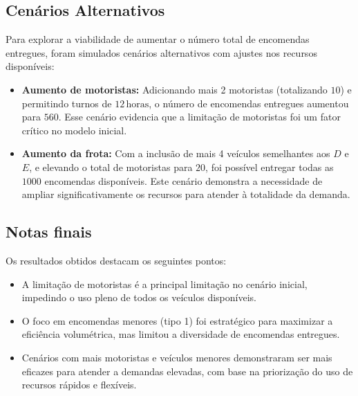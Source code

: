\subsection{Cenários Alternativos}\label{subsec:cenarios-alternativos}
Para explorar a viabilidade de aumentar o número total de encomendas entregues, foram simulados cenários alternativos com ajustes nos recursos disponíveis:
\begin{itemize}
    \item \textbf{Aumento de motoristas:} Adicionando mais 2 motoristas (totalizando \(10\)) e permitindo turnos de \(12 \, \mathrm{horas}\), o número de encomendas entregues aumentou para \(560\).
    Esse cenário evidencia que a limitação de motoristas foi um fator crítico no modelo inicial.
    \item \textbf{Aumento da frota:} Com a inclusão de mais 4 veículos semelhantes aos \(D\) e \(E\), e elevando o total de motoristas para \(20\), foi possível entregar todas as \(1000\) encomendas disponíveis.
    Este cenário demonstra a necessidade de ampliar significativamente os recursos para atender à totalidade da demanda.
\end{itemize}

\subsection{Notas finais}\label{subsec:conclusoes-dos-resultados}
Os resultados obtidos destacam os seguintes pontos:
\begin{itemize}
    \item A limitação de motoristas é a principal limitação no cenário inicial, impedindo o uso pleno de todos os veículos disponíveis.
    \item O foco em encomendas menores (tipo 1) foi estratégico para maximizar a eficiência volumétrica, mas limitou a diversidade de encomendas entregues.
    \item Cenários com mais motoristas e veículos menores demonstraram ser mais eficazes para atender a demandas elevadas, com base na priorização do uso de recursos rápidos e flexíveis.
\end{itemize}